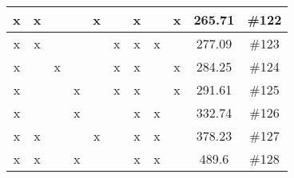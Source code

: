 \begin{center}
\begin{longtable}{|c|c|c|c|c|c|c|c|c|c|c|}
 x &  x &  &  &  x &  &  x &  &  x & 265.71 & \#122 \\ \hline
 x &  x &  &  &  &  x &  x &  x &  & 277.09 & \#123 \\ \hline
 x &  &  x &  &  &  x &  x &  &  x & 284.25 & \#124 \\ \hline
 x &  &  &  x &  &  x &  x &  &  x & 291.61 & \#125 \\ \hline
 x &  &  &  x &  &  &  x &  x &  & 332.74 & \#126 \\ \hline
 x &  x &  &  &  x &  &  x &  x &  & 378.23 & \#127 \\ \hline
 x &  x &  &  x &  &  &  x &  x &  & 489.6 & \#128 \\ \hline
\end{longtable}
\label{table:windProdInputParams}
\end{center}
\normalsize